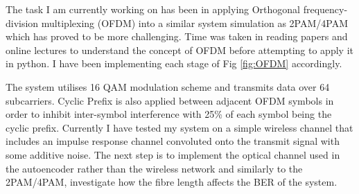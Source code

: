 \begin{itemize}
    The task I am currently working on has been in applying Orthogonal frequency-division multiplexing (OFDM) into a similar system simulation as 2PAM/4PAM which has proved to be more challenging. Time was taken in reading papers and online lectures to understand the concept of OFDM before attempting to apply it in python. I have been implementing each stage of Fig \ref{fig:OFDM} accordingly.
    
    The system utilises 16 QAM modulation scheme and transmits data over 64 subcarriers. Cyclic Prefix is also applied between adjacent OFDM symbols in order to inhibit inter-symbol interference with 25\% of each symbol being the cyclic prefix. Currently I have tested my system on a simple wireless channel that includes an impulse response channel convoluted onto the transmit signal with some additive noise. The next step is to implement the optical channel used in the autoencoder rather than the wireless network and similarly to the 2PAM/4PAM, investigate how the fibre length affects the BER of the system.
\end{itemize}
